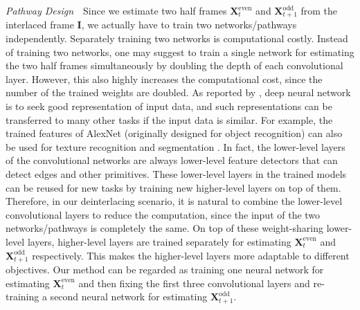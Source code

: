 \vspace{0.15in}
\noindent\emph{Pathway Design}\,\,\,\,
Since we estimate two half frames $\mathbf{X}^{\text{even}}_t$ and
$\mathbf{X}^{\text{odd}}_{t+1}$ from the interlaced frame $\mathbf{I}$, we
actually have to train two networks/pathways independently. Separately training two
networks is computational costly. Instead of training two networks, one
may suggest to train a single network for estimating the two half frames simultaneously
by doubling the depth of each convolutional layer. However, this also
highly increases the computational cost, since the number of the trained weights
are doubled. As reported by \cite{bengio2012deep}, deep neural network is to
seek good representation of input data, and such representations can be transferred
to many other tasks if the input data is similar. For example, the trained
features of AlexNet \cite{krizhevsky2012imagenet} (originally designed for
object recognition) can also be used for texture recognition and segmentation
\cite{cimpoi2015deep}. In fact, the lower-level layers of the convolutional
networks are always lower-level feature detectors that can detect edges and other
primitives. These lower-level layers in the trained models can be reused for new
tasks by training new higher-level layers on top of them. Therefore, in our
deinterlacing scenario, it is natural to combine the lower-level convolutional
layers to reduce the computation, since the input of the two networks/pathways is
completely the same. On top of these weight-sharing lower-level layers, higher-level 
layers are trained separately for estimating $\mathbf{X}^{\text{even}}_t$
and $\mathbf{X}^{\text{odd}}_{t+1}$ respectively. This makes the 
higher-level layers more adaptable to different objectives. Our method can be regarded
as training one neural network for estimating $\mathbf{X}^{\text{even}}_t$ and
then fixing the first three convolutional layers and re-training a second neural
network for estimating $\mathbf{X}^{\text{odd}}_{t+1}$.


